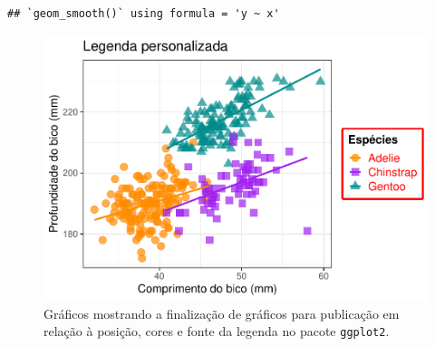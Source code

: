 \documentclass[
]{article}
\begin{document}
\begin{verbatim}
## `geom_smooth()` using formula = 'y ~ x'
\end{verbatim}

\begin{figure}
\centering
\includegraphics{epr_files/figure-latex/fig-plot-final-legenda-4.pdf}
\caption{\label{fig:fig-plot-final-legenda-4}Gráficos mostrando a finalização de gráficos para publicação em relação à posição, cores e fonte da legenda no pacote \texttt{ggplot2}.}
\end{figure}
\end{document}
